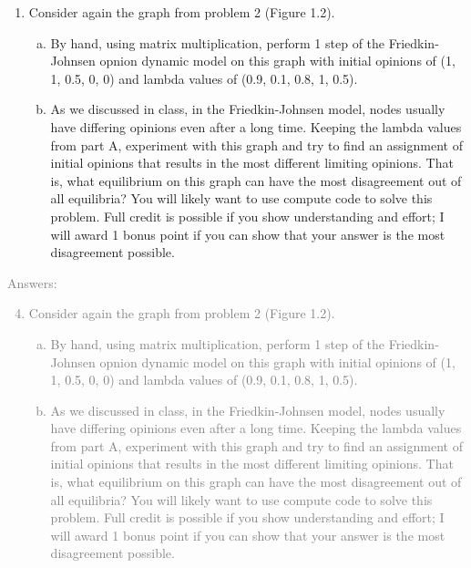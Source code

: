 \documentclass[11pt]{article}
\begin{document}
\begin{enumerate}
	\item Consider again the graph from problem 2 (Figure 1.2).
	\begin{enumerate}[(a)]
		\item By hand, using matrix multiplication, perform 1 step of the Friedkin-Johnsen opnion dynamic model on this graph with initial opinions of (1, 1, 0.5, 0, 0) and lambda values of (0.9, 0.1, 0.8, 1, 0.5).
		\item As we discussed in class, in the Friedkin-Johnsen model, nodes usually have differing opinions even after a long time. Keeping the lambda values from part A, experiment with this graph and try to find an assignment of initial opinions that results in the most different limiting opinions. That is, what equilibrium on this graph can have the most disagreement out of all equilibria? You will likely want to use compute code to solve this problem. Full credit is possible if you show understanding and effort; I will award 1 bonus point if you can show that your answer is the most disagreement possible.
	\end{enumerate}
\end{enumerate}
\textcolor{gray}{
Answers:
\begin{enumerate}
	\setcounter{enumi}{3}
	\item Consider again the graph from problem 2 (Figure 1.2).
	\begin{enumerate}[(a)]
		\item By hand, using matrix multiplication, perform 1 step of the Friedkin-Johnsen opnion dynamic model on this graph with initial opinions of (1, 1, 0.5, 0, 0) and lambda values of (0.9, 0.1, 0.8, 1, 0.5).
		\item As we discussed in class, in the Friedkin-Johnsen model, nodes usually have differing opinions even after a long time. Keeping the lambda values from part A, experiment with this graph and try to find an assignment of initial opinions that results in the most different limiting opinions. That is, what equilibrium on this graph can have the most disagreement out of all equilibria? You will likely want to use compute code to solve this problem. Full credit is possible if you show understanding and effort; I will award 1 bonus point if you can show that your answer is the most disagreement possible.
	\end{enumerate}
\end{enumerate}
}
\end{document}
